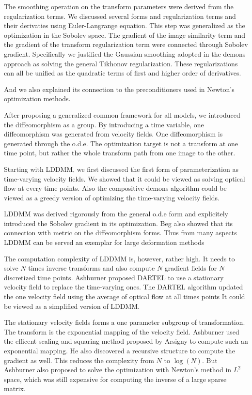 \documentclass[letterpaper,12pt]{article}
\begin{document}
The smoothing operation on the transform parameters were derived from the regularization terms. We discussed several forms and regularization terms and their derivaties using Euler-Langrange equation. 
This step was generalized as the optimization in the Sobolev space. The gradient of the image similarity term and the gradient of the transform regularization term were connected through Sobolev gradient.  Specifically we justified the Gaussian smoothing adopted in the demons approach as solving the general Tikhonov regularization. These regularizations can all be unified as the quadratic terms of first and higher order of derivatives. 

And we also explained its connection to the preconditioners used in Newton's optimization methods.

After proposing a generalized common framework for all models, we introduced the diffeomorphism as a group. By introducing a time variable, one diffeomorphism was generated from velocity fields. One diffeomorphism is generated through the o.d.e. The optimization target is not a transform at one time point, but rather the whole transform path from one image to the other. 

Starting with LDDMM, we first discussed the first form of parameterization as time-varying velocity fields. We showed that it could be viewed as solving optical flow at every time points. Also the compositive demons algorithm could be viewed as a greedy version of optimizing the time-varying velocity fields.

LDDMM was derived rigorously from the general o.d.e form and explicitely introduced the Sobolev gradient in its optimization. Beg also showed that its connection with metric on the diffeomorphism forms. Thus from many aspects LDDMM can be served an exemplar for large deformation methods 

The computation complexity of LDDMM is, however, rather high. It needs to solve $N$ times inverse transforms and also compute $N$ gradient fields for $N$ discretized time points. Ashburner proposed DARTEL to use a stationary velocity field to replace the time-varying ones. The DARTEL algorithm updated the one velocity field using the average of optical flow at all times points  It could be viewed as a simplified version of LDDMM.  

The stationary velocity fields forms a one parameter subgroup of transformation. The transform is the exponential mapping of the velocity field. Ashburner used the efficent scaling-and-squaring method proposed by Arsigny to compute such an exponential mapping. He also discovered a recursive structure to compute the gradient as well. This reduces the complexity from $N$ to $\log(N)$. But Ashburner also proposed to solve the optimization with Newton's method in $L^2$ space, which was still expensive for computing the inverse of a large sparse matrix.
\end{document}
